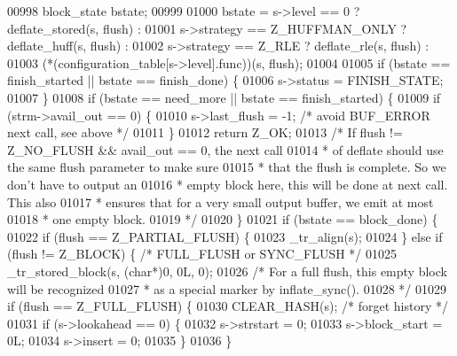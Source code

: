\begin{DoxyCode}
{00998         block\_state bstate;
00999 
01000         bstate = s->level == 0 ? deflate\_stored(s, flush) :
01001                  s->strategy == Z\_HUFFMAN\_ONLY ? deflate\_huff(s, flush) :
01002                  s->strategy == Z\_RLE ? deflate\_rle(s, flush) :
01003                  (*(configuration\_table[s->level].func))(s, flush);
01004 
01005         \textcolor{keywordflow}{if} (bstate == finish\_started || bstate == finish\_done) \{
01006             s->status = FINISH\_STATE;
01007         \}
01008         \textcolor{keywordflow}{if} (bstate == need\_more || bstate == finish\_started) \{
01009             \textcolor{keywordflow}{if} (strm->avail\_out == 0) \{
01010                 s->last\_flush = -1; \textcolor{comment}{/* avoid BUF\_ERROR next call, see above */}
01011             \}
01012             \textcolor{keywordflow}{return} Z\_OK;
01013             \textcolor{comment}{/* If flush != Z\_NO\_FLUSH && avail\_out == 0, the next call}
01014 \textcolor{comment}{             * of deflate should use the same flush parameter to make sure}
01015 \textcolor{comment}{             * that the flush is complete. So we don't have to output an}
01016 \textcolor{comment}{             * empty block here, this will be done at next call. This also}
01017 \textcolor{comment}{             * ensures that for a very small output buffer, we emit at most}
01018 \textcolor{comment}{             * one empty block.}
01019 \textcolor{comment}{             */}
01020         \}
01021         \textcolor{keywordflow}{if} (bstate == block\_done) \{
01022             \textcolor{keywordflow}{if} (flush == Z\_PARTIAL\_FLUSH) \{
01023                 \_tr\_align(s);
01024             \} \textcolor{keywordflow}{else} \textcolor{keywordflow}{if} (flush != Z\_BLOCK) \{ \textcolor{comment}{/* FULL\_FLUSH or SYNC\_FLUSH */}
01025                 \_tr\_stored\_block(s, (\textcolor{keywordtype}{char}*)0, 0L, 0);
01026                 \textcolor{comment}{/* For a full flush, this empty block will be recognized}
01027 \textcolor{comment}{                 * as a special marker by inflate\_sync().}
01028 \textcolor{comment}{                 */}
01029                 \textcolor{keywordflow}{if} (flush == Z\_FULL\_FLUSH) \{
01030                     CLEAR\_HASH(s);             \textcolor{comment}{/* forget history */}
01031                     \textcolor{keywordflow}{if} (s->lookahead == 0) \{
01032                         s->strstart = 0;
01033                         s->block\_start = 0L;
01034                         s->insert = 0;
01035                     \}
01036                 \}
}
\end{DoxyCode}
